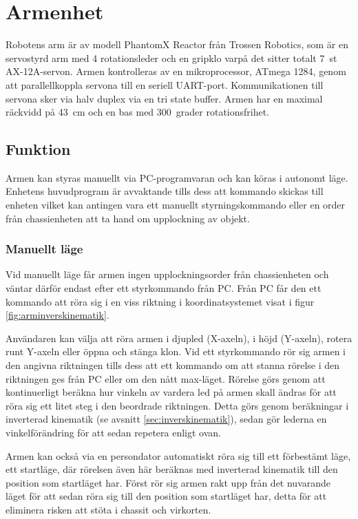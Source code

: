 \section{Armenhet}

Robotens arm är av modell PhantomX Reactor från Trossen Robotics, som är en servostyrd arm med 4 rotationsleder och en gripklo varpå det sitter totalt 7~st AX-12A-servon. Armen kontrolleras av en mikroprocessor, ATmega 1284, genom att parallellkoppla servona till en seriell UART-port. Kommunikationen till servona sker via halv duplex via en tri state buffer. Armen har en maximal räckvidd på 43~cm och en bas med  300~grader rotationsfrihet.

\subsection{Funktion}

Armen kan styras manuellt via PC-programvaran och kan köras i autonomt läge. Enhetens huvudprogram är avvaktande tills dess att kommando skickas till enheten vilket kan antingen vara ett manuellt styrningskommando eller en order från chassienheten att ta hand om upplockning av objekt.

\subsubsection{Manuellt läge} 

Vid manuellt läge får armen ingen upplockningsorder från chassienheten och väntar därför endast efter ett styrkommando från PC. Från PC får den ett kommando att röra sig i en viss riktning i koordinatsystemet visat i figur \ref{fig:arminverskinematik}.

Användaren kan välja att röra armen i djupled (X-axeln), i höjd (Y-axeln), rotera runt Y-axeln eller öppna och stänga klon. Vid ett styrkommando rör sig armen i den angivna riktningen tills dess att ett kommando om att stanna rörelse i den riktningen ges från PC eller om den nått max-läget. Rörelse görs genom att kontinuerligt beräkna hur vinkeln av vardera led på armen skall ändras för att röra sig ett litet steg i den beordrade riktningen. Detta görs genom beräkningar i inverterad kinematik (se avsnitt \ref{sec:inverskinematik}), sedan gör lederna en vinkelförändring för att sedan repetera enligt ovan.

Armen kan också via en persondator automatiskt röra sig till ett förbestämt läge, ett startläge, där rörelsen även här beräknas med inverterad kinematik till den position som startläget har. Först rör sig armen rakt upp från det nuvarande läget för att sedan röra sig till den position som startläget har, detta för att eliminera risken att stöta i chassit och virkorten.

